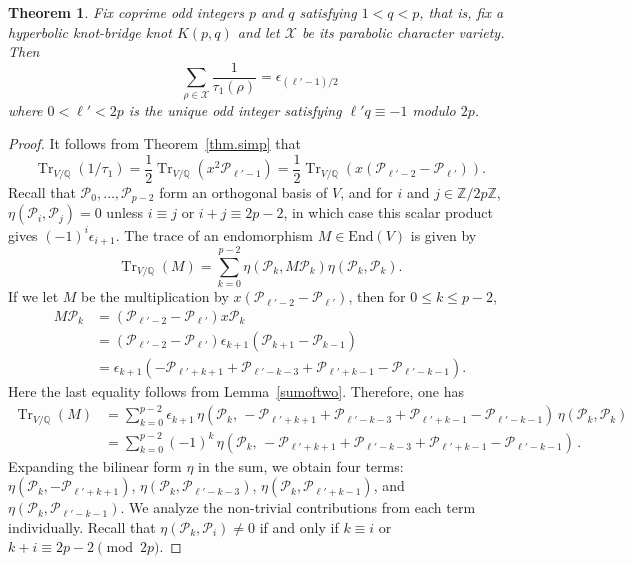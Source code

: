 \documentclass{amsart}
\newcommand{\Q}{\mathbb{Q}}
\newcommand{\Z}{\mathbb{Z}}
\newcommand{\calX}{\mathcal{X}}
\DeclareMathOperator{\Tr}{Tr}
\def\calP{\mathcal{P}}
\newtheorem{Theorem}{Theorem}[section]
\theoremstyle{definition}
\begin{document}
\begin{Theorem}
\label{thm.invtau1}
    Fix coprime odd integers $p$ and $q$ satisfying $1 <q <p $, that is, fix a hyperbolic knot-bridge knot $K(p,q)$ and let $\calX$ be its parabolic character variety. Then 
    \begin{equation*}
        \sum_{\rho \in \calX} \frac{1}{\tau_1(\rho)} = \epsilon_{(\ell'-1)/2}
    \end{equation*}
    where $0<\ell'<2p$ is the unique odd integer satisfying $\ell'q \equiv -1$ modulo $2p$.
\end{Theorem}
\begin{proof}
    It follows from Theorem~\ref{thm.simp} that  
    $$\Tr_{V/\Q}(1/\tau_1)=\frac{1}{2}\Tr_{V/\Q}(x^2 \calP_{\ell'-1})=\frac{1}{2}\Tr_{V/\Q}(x(\calP_{\ell'-2}-\calP_{\ell'})).$$ Recall that $\calP_0,\ldots,\calP_{p-2}$ form an orthogonal basis of $V$, and for $i$ and $j\in \Z/2p\Z$, $\eta(\calP_i,\calP_j)=0$ unless $i \equiv j$ or $i+j \equiv 2p-2$, in which case this scalar product gives $(-1)^i \epsilon_{i+1}$. 
    The trace of an endomorphism $M \in \text{End}(V)$ is given by $$\Tr_{V/\Q}(M)=\sum_{k=0}^{p-2}\eta(\calP_k, M\calP_k)\eta(\calP_k,\calP_k).$$ If we let $M$ be the multiplication by $x(\calP_{\ell'-2}-\calP_{\ell'})$, then  for $0\leq k \leq p-2$, 
    \begin{align*}
    M\calP_k&=(\calP_{\ell'-2}-\calP_{\ell'}) x\calP_k\\
    &=(\calP_{\ell'-2}-\calP_{\ell'})\epsilon_{k+1}(\calP_{k+1}-\calP_{k-1})\\
    &=\epsilon_{k+1}(-\calP_{\ell'+k+1}+\calP_{\ell'-k-3}+\calP_{\ell'+k-1}-\calP_{\ell'-k-1}).
    \end{align*}
    Here the last equality follows from Lemma~\ref{sumoftwo}.
    Therefore, one has
    \begin{align*}
        \Tr_{V/\Q}(M)&=\sum_{k=0}^{p-2}\epsilon_{k+1}\,\eta(\calP_k,\,-\calP_{\ell'+k+1}+\calP_{\ell'-k-3}+\calP_{\ell'+k-1}-\calP_{\ell'-k-1})\,\eta(\calP_k,\calP_k)\\
        &=\sum_{k=0}^{p-2}(-1)^k\,\eta(\calP_k,\,-\calP_{\ell'+k+1}+\calP_{\ell'-k-3}+\calP_{\ell'+k-1}-\calP_{\ell'-k-1}) \, .
    \end{align*}
    Expanding the bilinear form $\eta$ in the sum, we obtain four terms: $\eta(\calP_k, -\calP_{\ell'+k+1})$, $\eta(\calP_k,\calP_{\ell'-k-3})$, $\eta(\calP_k,\calP_{\ell'+k-1})$, and $\eta(\calP_k,\calP_{\ell'-k-1})$.
    We analyze the non-trivial contributions from each term individually. Recall that $\eta(\calP_k,\calP_i) \neq 0$ if and only if $k \equiv i$ or $k+i \equiv 2p-2 \pmod{2p}$.

\end{proof}
\end{document}
